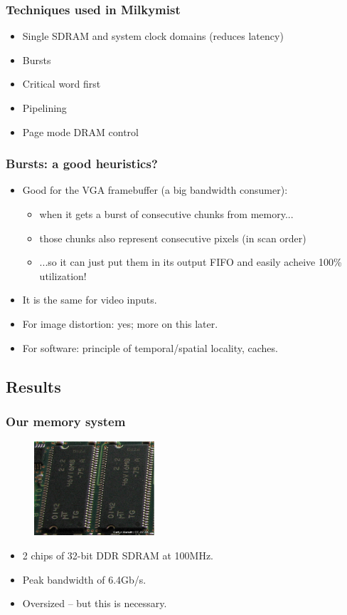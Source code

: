 \documentclass{beamer}
\begin{document}
\frame
{
  \frametitle{Techniques used in Milkymist}
  \begin{itemize}
  \item Single SDRAM and system clock domains (reduces latency)
  \item Bursts
  \item Critical word first
  \item Pipelining
  \item Page mode DRAM control
  \end{itemize}
}

\frame
{
  \frametitle{Bursts: a good heuristics?}

  \begin{itemize}
  \item Good for the VGA framebuffer (a big bandwidth consumer):
  \begin{itemize}
  \item when it gets a burst of consecutive chunks from memory...
  \item those chunks also represent consecutive pixels (in scan order)
  \item ...so it can just put them in its output FIFO and easily acheive 100\% utilization!
  \end{itemize}
  \item It is the same for video inputs.
  \item For image distortion: yes; more on this later.
  \item For software: principle of temporal/spatial locality, caches.
  \end{itemize}
}

\subsection{Results}
\frame
{
  \frametitle{Our memory system}

  \begin{figure}[H]
  \includegraphics[height=35mm]{ddr64.eps}
  \end{figure}

  \begin{itemize}
  \item 2 chips of 32-bit DDR SDRAM at 100MHz.
  \item Peak bandwidth of 6.4Gb/s.
  \item Oversized -- but this is necessary.
  \end{itemize}
}
\end{document}
